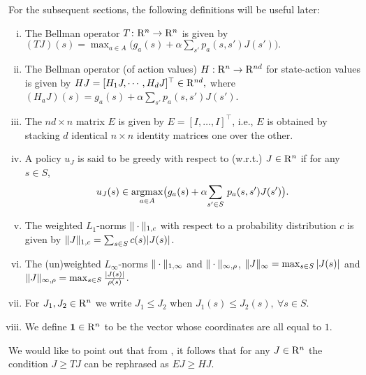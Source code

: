 For the subsequent sections, the following definitions will be useful later:
\begin{definition}\label{notations}
\begin{comment}
Let $c,\rho,\chi:S \to \R_+$ be positive valued functions, where $\R_+$ denotes the set of strictly positive reals. Then for $J\in \R^n$, $a\in A$ and $s\in S$,
define
\end{comment}
\begin{enumerate}[(i)]
\item\label{bellopval} The Bellman operator $T\colon \mathrm{R}^n \rightarrow \mathrm{R}^n$ is given by $(TJ)(s)=\max_{a \in A}\big(g_a(s)+\alpha \sum_{s'} p_a(s,s')J(s')\big).
$
\item \label{bellactval} The Bellman operator (of action values) $H: \mathrm{R}^n \to \mathrm{R}^{nd}$ for state-action values is given by $HJ=[ H_1 J,\cdots,H_d J]^\top\in \mathrm{R}^{nd},$ where $(H_a J)(s)= g_a(s)+\alpha \sum_{s'}p_a(s,s') J(s')$.
\item\label{emat} The $nd\times n$ matrix $E$ is given by $E=[I,\ldots,I]^\top$, i.e., $E$ is obtained by stacking $d$ identical $n\times n$ identity matrices one over the other.
\item\label{greedy} A policy $u_J$ is said to be greedy with respect to (w.r.t.) $J\in \mathrm{R}^n$ if for any $s\in S$,
\begin{align*} u_J(s)\in\underset{a\in A}{\operatorname{argmax}}\big(g_a(s)+\alpha \underset{s'\in S}{\sum}~ p_a(s,s')J(s')\big).\end{align*}
\item\label{norms} The weighted $L_1$-norms $\|\cdot\|_{1,c}$ with respect to a probability distribution $c$ is given by $
\|J\|_{1,c}=\sum_{s \in S} c(s)|J(s)|$.
\item The (un)weighted $L_\infty$-norms $\|\cdot\|_{1,\infty}$
and $\|\cdot\|_{\infty,\rho}$, $\|J\|_{\infty}=\max_{s\in S}|J(s)|$ and $\|J\|_{\infty,\rho}=\max_{s \in S} \frac{|J(s)|}{\rho(s)}$.
\item For $J_1, J_2\in \mathrm{R}^n$ we write $J_1\leq J_2$ when $J_1(s)\leq J_2(s),~\forall s\in S$.
\item We define $\mathbf{1}\in \mathrm{R}^n$ to be the vector whose coordinates are all equal to $1$.
\end{enumerate}
\end{definition}
We would like to point out that from , it follows that for any $J\in \mathrm{R}^n$ the condition $J\geq TJ$ can be rephrased as $EJ\geq HJ$.
